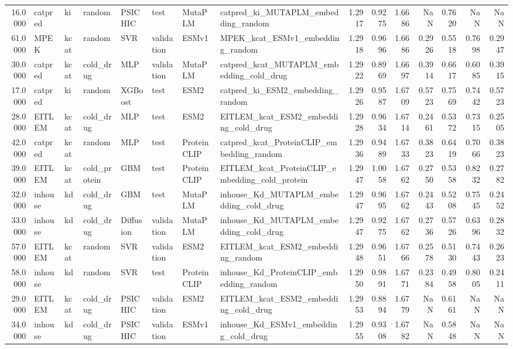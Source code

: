 \begin{tabular}{rlllllllrrrrrrr}
16.0000 & catpred & ki & random & PSICHIC & test & MutaPLM & catpred_ki_MUTAPLM_embedding_random & 1.2917 & 0.9275 & 1.6686 & NaN & 0.7620 & NaN & NaN \\
61.0000 & MPEK & kcat & random & SVR & validation & ESMv1 & MPEK_kcat_ESMv1_embedding_random & 1.2918 & 0.9696 & 1.6686 & 0.2926 & 0.5518 & 0.7698 & 0.2947 \\
30.0000 & catpred & kcat & cold_drug & MLP & validation & MutaPLM & catpred_kcat_MUTAPLM_embedding_cold_drug & 1.2922 & 0.8969 & 1.6697 & 0.3914 & 0.6617 & 0.6085 & 0.3915 \\
17.0000 & catpred & ki & random & XGBoost & test & ESM2 & catpred_ki_ESM2_embedding_random & 1.2926 & 0.9587 & 1.6709 & 0.5723 & 0.7569 & 0.7442 & 0.5723 \\
28.0000 & EITLEM & kcat & cold_drug & MLP & test & ESM2 & EITLEM_kcat_ESM2_embedding_cold_drug & 1.2928 & 0.9634 & 1.6714 & 0.2461 & 0.5372 & 0.7315 & 0.2505 \\
42.0000 & catpred & kcat & random & MLP & test & ProteinCLIP & catpred_kcat_ProteinCLIP_embedding_random & 1.2936 & 0.9489 & 1.6733 & 0.3823 & 0.6419 & 0.7066 & 0.3823 \\
39.0000 & EITLEM & kcat & cold_protein & GBM & test & ProteinCLIP & EITLEM_kcat_ProteinCLIP_embedding_cold_protein & 1.2947 & 1.0058 & 1.6762 & 0.2750 & 0.5358 & 0.8232 & 0.2782 \\
32.0000 & inhouse & kd & cold_drug & GBM & test & MutaPLM & inhouse_Kd_MUTAPLM_embedding_cold_drug & 1.2947 & 0.9695 & 1.6762 & 0.2443 & 0.5208 & 0.7545 & 0.2452 \\
33.0000 & inhouse & kd & cold_drug & Diffusion & validation & MutaPLM & inhouse_Kd_MUTAPLM_embedding_cold_drug & 1.2947 & 0.9275 & 1.6762 & 0.2736 & 0.5726 & 0.6396 & 0.2832 \\
57.0000 & EITLEM & kcat & random & SVR & validation & ESM2 & EITLEM_kcat_ESM2_embedding_random & 1.2948 & 0.9651 & 1.6766 & 0.2578 & 0.5130 & 0.7443 & 0.2623 \\
58.0000 & inhouse & kd & random & SVR & test & ProteinCLIP & inhouse_Kd_ProteinCLIP_embedding_random & 1.2950 & 0.9891 & 1.6771 & 0.2384 & 0.4958 & 0.8005 & 0.2411 \\
29.0000 & EITLEM & kcat & cold_drug & PSICHIC & validation & ESM2 & EITLEM_kcat_ESM2_embedding_cold_drug & 1.2953 & 0.8894 & 1.6779 & NaN & 0.6161 & NaN & NaN \\
34.0000 & inhouse & kd & cold_drug & PSICHIC & validation & ESMv1 & inhouse_Kd_ESMv1_embedding_cold_drug & 1.2955 & 0.9308 & 1.6782 & NaN & 0.5848 & NaN & NaN \\

\end{tabular}
